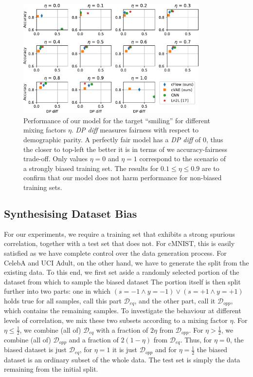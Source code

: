 \begin{figure}[tb]
    \centering
    \includegraphics[width=0.85\textwidth]{nifr/Figures/nosinn_celeba_multiplot_all_landscape_Smiling.pdf}
    \caption{
        Performance of our model for the target ``smiling'' for different mixing factors $\eta$.
        \emph{DP diff} measures fairness with respect to demographic parity.
        A perfectly fair model has a \emph{DP diff} of 0, thus the closer to top-left the better it
        is in terms of we accuracy-fairness trade-off.
        Only values $\eta=0$ and $\eta=1$ correspond to the scenario of a strongly biased training
        set.
        The results for $0.1\leq \eta\leq 0.9$ are to confirm that our model does not harm
        performance for non-biased training sets.
    }%
    \label{fig:celeba-multiplot}
\end{figure}
%
\subsection{Synthesising Dataset Bias}
%
For our experiments, we require a training set that exhibits a strong spurious correlation,
together with a test set that does not.
%
For cMNIST, this is easily satisfied as we have complete control over the data generation process.
%
For CelebA and  UCI Adult, on the other hand, we have to generate the split from the existing data.
%
To this end, we first set aside a randomly selected portion of the dataset from which to sample the
biased dataset
%
The portion itself is then split further into two parts: one in which $(s=-1 \land y=-1) \lor (s=+1
\land y=+1)$ holds true for all samples, call this part $\mathcal{D}_{eq}$, and the other part,
call it $\mathcal{D}_{opp}$, which contains the remaining samples.
%
To investigate the behaviour at different levels of correlation, we mix these two subsets according
to a mixing factor $\eta$.
%
For $\eta \leq \tfrac{1}{2}$, we combine (all of) $\mathcal{D}_{eq}$ with a fraction of $2\eta$
from $\mathcal{D}_{opp}$.
%
For $\eta > \tfrac{1}{2}$, we combine (all of) $\mathcal{D}_{opp}$ and a fraction of $2(1 -\eta)$
from $\mathcal{D}_{eq}$.
%
Thus, for $\eta=0$, the biased dataset is just $\mathcal{D}_{eq}$, for $\eta=1$ it is just
$\mathcal{D}_{opp}$ and for $\eta=\tfrac{1}{2}$ the biased dataset is an ordinary subset of the
whole data. The test set is simply the data remaining from the initial split.
%
